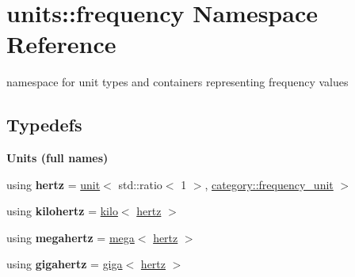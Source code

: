 \hypertarget{namespaceunits_1_1frequency}{}\section{units\+:\+:frequency Namespace Reference}
\label{namespaceunits_1_1frequency}


namespace for unit types and containers representing frequency values  


\subsection*{Typedefs}
\begin{Indent}{\bf Units (full names)}\par
\begin{DoxyCompactItemize}
\item 
\hypertarget{namespaceunits_1_1frequency_a1c62bca30f0d43d1554a3e4dcb964a37}{}using {\bfseries hertz} = \hyperlink{structunits_1_1unit}{unit}$<$ std\+::ratio$<$ 1 $>$, \hyperlink{namespaceunits_1_1category_a5abfda6ffc83788eaab44d80e1acadda}{category\+::frequency\+\_\+unit} $>$\label{namespaceunits_1_1frequency_a1c62bca30f0d43d1554a3e4dcb964a37}

\item 
\hypertarget{namespaceunits_1_1frequency_ac41f26d37aed904b64178b7495b9e188}{}using {\bfseries kilohertz} = \hyperlink{group___unit_manipulators_ga89965a45aaa6689548b9c53858759c5e}{kilo}$<$ \hyperlink{structunits_1_1unit}{hertz} $>$\label{namespaceunits_1_1frequency_ac41f26d37aed904b64178b7495b9e188}

\item 
\hypertarget{namespaceunits_1_1frequency_ade19c55fe7c7ce62611b4a834cd4ff85}{}using {\bfseries megahertz} = \hyperlink{group___unit_manipulators_gab1e685fcf4dd9478ed3d688f7af50842}{mega}$<$ \hyperlink{structunits_1_1unit}{hertz} $>$\label{namespaceunits_1_1frequency_ade19c55fe7c7ce62611b4a834cd4ff85}

\item 
\hypertarget{namespaceunits_1_1frequency_a6e323ed627787021d71e12654d651803}{}using {\bfseries gigahertz} = \hyperlink{group___unit_manipulators_ga4595911f659ef61133216da15d61eb07}{giga}$<$ \hyperlink{structunits_1_1unit}{hertz} $>$\label{namespaceunits_1_1frequency_a6e323ed627787021d71e12654d651803}

\end{DoxyCompactItemize}
\end{Indent}

